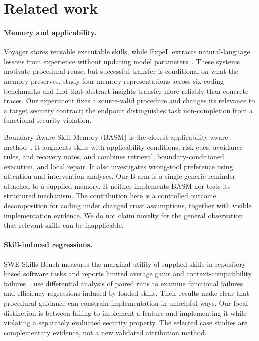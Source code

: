 \section{Related work}
\paragraph{Memory and applicability.}
Voyager stores reusable executable skills, while ExpeL extracts natural-language lessons from experience without updating model parameters~\citep{voyager,expel}. These systems motivate procedural reuse, but successful transfer is conditional on what the memory preserves. \citet{mtl} study four memory representations across six coding benchmarks and find that abstract insights transfer more reliably than concrete traces. Our experiment fixes a source-valid procedure and changes its relevance to a target security contract; the endpoint distinguishes task non-completion from a functional security violation.

Boundary-Aware Skill Memory (BASM) is the closest applicability-aware method~\citep{basm}. It augments skills with applicability conditions, risk cues, avoidance rules, and recovery notes, and combines retrieval, boundary-conditioned execution, and local repair. It also investigates wrong-tool preference using attention and intervention analyses. Our B arm is a single generic reminder attached to a supplied memory. It neither implements BASM nor tests its structured mechanism. The contribution here is a controlled outcome decomposition for coding under changed trust assumptions, together with visible implementation evidence. We do not claim novelty for the general observation that relevant skills can be inapplicable.

\paragraph{Skill-induced regressions.}
SWE-Skills-Bench measures the marginal utility of supplied skills in repository-based software tasks and reports limited average gains and context-compatibility failures~\citep{sweskills}. \citet{harmfulskills} use differential analysis of paired runs to examine functional failures and efficiency regressions induced by loaded skills. Their results make clear that procedural guidance can constrain implementation in unhelpful ways. Our focal distinction is between failing to implement a feature and implementing it while violating a separately evaluated security property. The selected case studies are complementary evidence, not a new validated attribution method.

